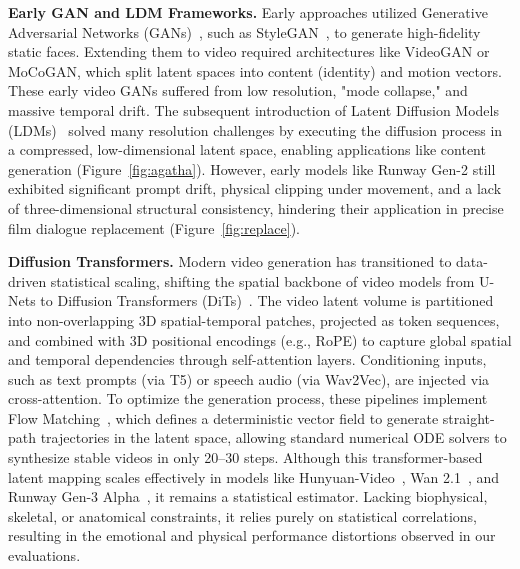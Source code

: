 \documentclass[pdflatex,sn-mathphys-num]{sn-jnl}
\theoremstyle{thmstyleone}
\theoremstyle{thmstyletwo}
\theoremstyle{thmstylethree}
\begin{document}
\textbf{Early GAN and LDM Frameworks.} Early approaches utilized Generative Adversarial Networks (GANs)~\cite{goodfellow2014generative}, such as StyleGAN~\cite{karras2019style}, to generate high-fidelity static faces. Extending them to video required architectures like VideoGAN or MoCoGAN, which split latent spaces into content (identity) and motion vectors. These early video GANs suffered from low resolution, "mode collapse," and massive temporal drift. The subsequent introduction of Latent Diffusion Models (LDMs)~\cite{rombach2022high} solved many resolution challenges by executing the diffusion process in a compressed, low-dimensional latent space, enabling applications like content generation (Figure~\ref{fig:agatha}). However, early models like Runway Gen-2 still exhibited significant prompt drift, physical clipping under movement, and a lack of three-dimensional structural consistency, hindering their application in precise film dialogue replacement (Figure~\ref{fig:replace}).

\textbf{Diffusion Transformers.} Modern video generation has transitioned to data-driven statistical scaling, shifting the spatial backbone of video models from U-Nets to Diffusion Transformers (DiTs)~\cite{peebles2023scalable}. The video latent volume is partitioned into non-overlapping 3D spatial-temporal patches, projected as token sequences, and combined with 3D positional encodings (e.g., RoPE) to capture global spatial and temporal dependencies through self-attention layers. Conditioning inputs, such as text prompts (via T5) or speech audio (via Wav2Vec), are injected via cross-attention. To optimize the generation process, these pipelines implement Flow Matching~\cite{lipman2022flow}, which defines a deterministic vector field to generate straight-path trajectories in the latent space, allowing standard numerical ODE solvers to synthesize stable videos in only 20--30 steps. Although this transformer-based latent mapping scales effectively in models like Hunyuan-Video~\cite{hunyuan2024video}, Wan 2.1~\cite{wan2025wan21}, and Runway Gen-3 Alpha~\cite{runway2024gen3}, it remains a statistical estimator. Lacking biophysical, skeletal, or anatomical constraints, it relies purely on statistical correlations, resulting in the emotional and physical performance distortions observed in our evaluations.
\end{document}
